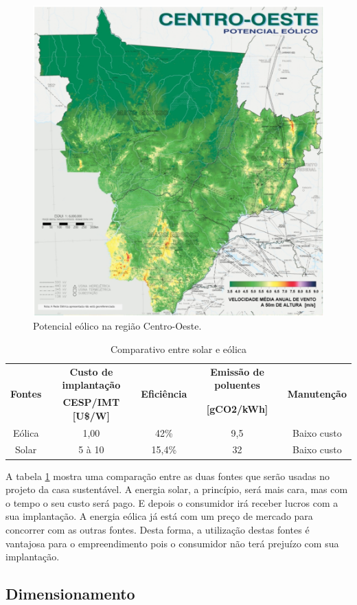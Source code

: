 \begin{figure}[H]
\centering
\includegraphics[width=.65\linewidth,keepaspectratio,angle=0]{figuras/potencial_centro_oeste.eps}
\caption{Potencial eólico na região Centro-Oeste.}
\label{potencial_centro_oeste}
\end{figure}

\begin{table}[H]
\centering
\begin{tabular}{|c|c|c|c|c|}
\hline 
\multirow{2}{*}{\textbf{Fontes}} & \textbf{Custo de implantação} & \multirow{2}{*}{\textbf{Eficiência}} & \textbf{Emissão de poluentes} & \multirow{2}{*}{\textbf{Manutenção}}\tabularnewline
 & \textbf{CESP/IMT {[}U\$/W{]}} &  & \textbf{{[}gCO2/kWh{]}} & \tabularnewline
\hline 
\hline 
Eólica & 1,00 & 42\% & 9,5 & Baixo custo\tabularnewline
\hline 
Solar & 5 à 10 & 15,4\% & 32 & Baixo custo\tabularnewline
\hline 
\end{tabular}
\caption{Comparativo entre solar e eólica}
\label{comparativo_solar_eolica}
\end{table}

A tabela \ref{comparativo_solar_eolica} mostra uma comparação entre as duas fontes que serão usadas no projeto da casa sustentável. A energia solar, a princípio, será mais cara, mas com o tempo o seu custo será pago. E depois o consumidor irá receber lucros com a sua implantação. A energia eólica já está com um preço de mercado para concorrer com as outras fontes. Desta forma, a utilização destas fontes é vantajosa para o empreendimento pois o consumidor não terá prejuízo com sua implantação.

\subsection{Dimensionamento}

